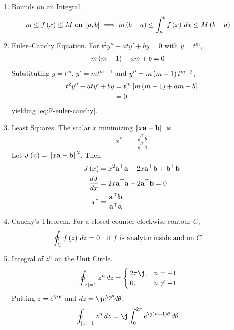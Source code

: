\begin{enumerate}[label=\thesubsection.\arabic*, ref=\thesubsection.\theenumi]
\item Bounds on an Integral.
\begin{align}
m \le f\left(x\right) \le M \text{ on } {}\left[a, b\right] &\implies m\left(b - a\right) \le \int_{a}^{b} f\left(x\right) \,dx \le M\left(b - a\right)
\label{eq:F-intbound}
\end{align}
\item Euler--Cauchy Equation. For $t^2 y'' + a t y' + b y = 0$ with $y = t^m$,
\begin{align}
m\left(m - 1\right) + a m + b &= 0
\label{eq:F-euler-cauchy}
\end{align}
\solution Substituting $y = t^m$, $y' = m t^{m-1}$ and $y'' = m\left(m-1\right)t^{m-2}$,
\begin{align}
t^2 y'' + a t y' + b y &= t^m {}\left[m\left(m - 1\right) + a m + b\right]
\\
&= 0
\end{align}
yielding \eqref{eq:F-euler-cauchy}.
\item Least Squares.
The scalar $x$ minimizing $\left\lVert x\mathbf{a} - \mathbf{b}\right\rVert$ is
\begin{align}
x^* &= \frac{\vec{a}^\top \vec{b}}{\vec{a}^\top \vec{a}}
\label{eq:F-ls}
\end{align}
\solution Let $J\left(x\right) = \left\lVert x\mathbf{a} - \mathbf{b}\right\rVert^2$. Then
\begin{align}
J\left(x\right) &= x^2 \mathbf{a}^\top \mathbf{a} - 2x \mathbf{a}^\top \mathbf{b} + \mathbf{b}^\top \mathbf{b}
\\
\frac{dJ}{dx} &= 2x \mathbf{a}^\top \mathbf{a} - 2\mathbf{a}^\top \mathbf{b} = 0
\\
x^* &= \frac{\mathbf{a}^\top \mathbf{b}}{\mathbf{a}^\top \mathbf{a}}
\end{align}
\item Cauchy's Theorem. For a closed counter-clockwise contour $C$,
\begin{align}
\oint_{C} f\left(z\right) \,dz &= 0 \quad \text{if } f \text{ is analytic inside and on } C
\label{eq:F-cauchy}
\end{align}
\item Integral of $z^n$ on the Unit Circle.
\begin{align}
\oint_{\abs{z} = 1} z^n \,dz &= \begin{cases} 2\pi \j, & n = -1 \\ 0, & n \ne -1 \end{cases}
\label{eq:F-zn}
\end{align}
\solution Putting $z = e^{\j \theta}$ and $dz = \j e^{\j \theta} d\theta$,
\begin{align}
\oint_{\abs{z} = 1} z^n \,dz &= \j \int_{0}^{2\pi} e^{\j \brak{n + 1}\theta} \,d\theta

\end{align}
\end{enumerate}

